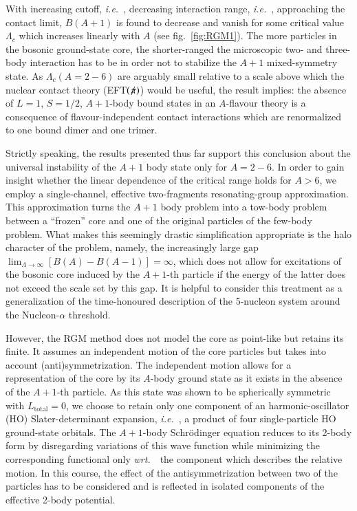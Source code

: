 \documentclass[preprint,12pt]{elsarticle}
\newcommand{\wrt}{\textit{wrt.}~}
\newcommand{\ie}{\textit{i.e.}~}
\newcommand{\eftnopi}{\mbox{EFT$(\not \! \pi)$}}
\newcommand{\figref}[1]{fig.~\ref{#1}}
\begin{document}
With increasing cutoff, \ie, decreasing interaction range, \ie, approaching the contact limit, $B(A+1)$ is found to decrease
and vanish for some critical value $\Lambda_c$ which increases linearly with $A$ (see \figref{fig:RGM1}).
The more particles in the bosonic ground-state core, the shorter-ranged the microscopic two- and three-body interaction
has to be in order not to stabilize the $A+1$ mixed-symmetry state.
As $\Lambda_c(A=2-6)$ are arguably small relative to a scale above which the nuclear contact theory (\eftnopi) would
be useful, the result implies: the absence of $L=1$, $S=1/2$, $A+1$-body bound states in an $A$-flavour theory
is a consequence of flavour-independent contact interactions which are renormalized to one bound dimer and one trimer. 

Strictly speaking, the results presented thus far support this conclusion about the universal instability of the $A+1$
body state only for $A=2-6$. In order to gain insight whether the linear dependence of the critical range holds for
$A>6$, we employ a single-channel, effective two-fragments resonating-group approximation. This approximation
turns the $A+1$ body problem into a tow-body problem between a ``frozen'' core and one of the original particles of
the few-body problem. What makes this seemingly drastic simplification appropriate is the halo character of the problem,
namely, the increasingly large gap $\lim_{\Lambda\to\infty}\left[B(A)-B(A-1)\right]=\infty$, which does not
allow for excitations of the bosonic core induced by the $A+1$-th particle if the energy of the latter
does not exceed the scale set by this gap. It is helpful to consider this treatment as a generalization of the
time-honoured description of the 5-nucleon system around the Nucleon-$\alpha$ threshold.

However, the RGM method does not model the core as point-like but retains its finite. It assumes
an independent motion of the core particles but takes into account (anti)symmetrization.
The independent motion allows for a representation of the core by
its $A$-body ground state as it exists in the absence of the $A+1$-th particle.
As this state was shown
to be spherically symmetric with $L_\text{total}=0$, we choose to retain only one component of an harmonic-oscillator (HO)
Slater-determinant expansion, \ie, a product of four single-particle HO ground-state orbitals.
The $A+1$-body Schr\"odinger equation reduces to its 2-body form by disregarding variations of this wave function
while minimizing the corresponding functional only \wrt~the component which describes the relative motion.
In this course, the effect of the antisymmetrization between two of the particles has to be considered and is reflected
in isolated components of the effective 2-body potential.
\end{document}
